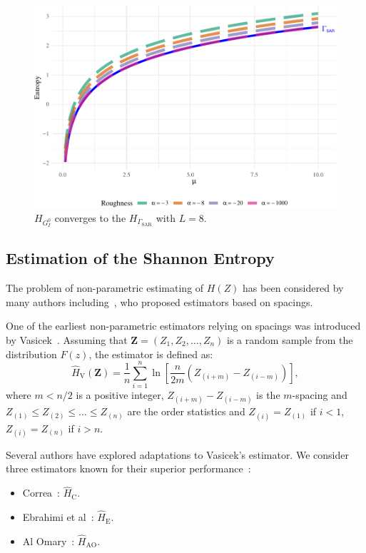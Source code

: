 \documentclass[remotesensing,article,submit,moreauthors,pdftex]{Definitions/mdpi}
\begin{document}
\begin{figure}[hbt]
\includegraphics[width=0.7\linewidth]{Identifying-Heterogeneity-in-SAR-Data-with-New-Test-Statistics_files/figure-latex/Plot_GI0_to_gamma1-1} \caption{$H_{ G_I^0}$ converges to the $H_{\Gamma_{\text{SAR}}}$ with $L=8$.}\label{fig:Plot_GI0_to_gamma1}
\end{figure}

\hypertarget{estimation-of-the-shannon-entropy}{%
\subsection{Estimation of the Shannon
Entropy}\label{estimation-of-the-shannon-entropy}}

The problem of non-parametric estimating of \(H(Z)\) has been considered
by many authors
including~\cite{vasicek1976test, Wieczorkowski1999,correa1995new,AlOmari2019},
who proposed estimators based on spacings.

One of the earliest non-parametric estimators relying on spacings was
introduced by Vasicek~\cite{vasicek1976test}. Assuming that
\(\bm{Z}=(Z_1, Z_2,\ldots,Z_n)\) is a random sample from the
distribution \(F(z)\), the estimator is defined as: \begin{equation*}
\label{E:Vas}
    \widehat{H}_{\text{V}}(\bm{Z})=\frac{1}{n}\sum_{i=1}^{n}\ln\left[\frac{n}{2m}\left(Z_{(i+m)}-Z_{(i-m)}\right)\right],
    \end{equation*} where \(m<n/2\) is a positive integer,
\(Z_{(i+m)}-Z_{(i-m)}\) is the \(m\)-spacing and
\(Z_{(1)}\leq Z_{(2)}\leq\ldots\leq Z_{(n)}\) are the order statistics
and \(Z_{(i)}= Z_{(1)}\) if \(i<1\), \(Z_{(i)}= Z_{(n)}\) if \(i>n\).

Several authors have explored adaptations to Vasicek's estimator. We
consider three estimators known for their superior
performance~\cite{Cassetti2022}:

\begin{itemize}
\item
  Correa~\cite{correa1995new}: \(\widehat{H}_{\text{C}}\).
\item
  Ebrahimi et al~\cite{Ebrahimi1994}: \(\widehat{H}_{\mathrm{E}}\).
\item
  Al Omary~\cite{IbrahimAlOmari2014}: \(\widehat{H}_{\mathrm{AO}}\).
\end{itemize}
\end{document}
